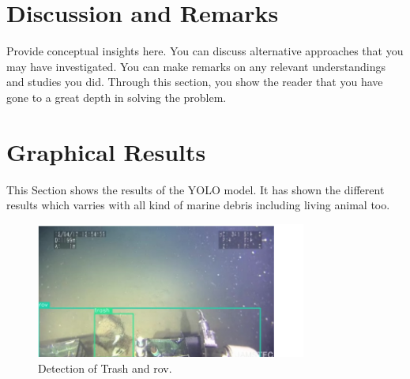 \documentclass[lettersize,journal]{IEEEtran}
\begin{document}
\newpage
\section{Discussion and Remarks}

Provide conceptual insights here. You can discuss alternative approaches that you may have investigated. You can make remarks on any relevant understandings and studies you did. Through this section, you show the reader that you have gone to a great depth in solving the problem.


\section{Graphical Results}
This Section shows the results of the YOLO model. It has shown the different results which varries with all kind of marine debris including living animal too.

\begin{figure}[!h]
\centering
\includegraphics[width=3.5in]{r1.png}
\caption{Detection of Trash and rov.}
\label{fig_1}
\end{figure}
\end{document}
